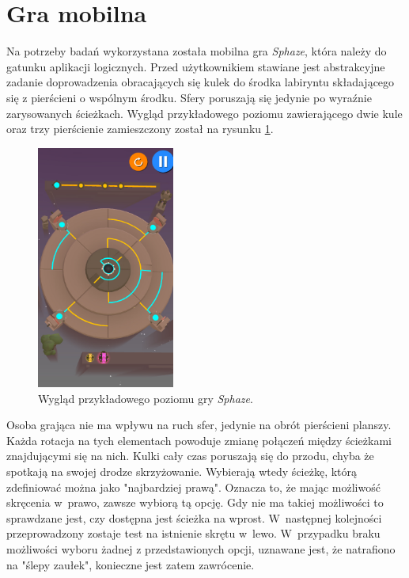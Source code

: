 \documentclass[a4paper,12pt,numbers=noenddot]{report}
\begin{document}
\section{Gra mobilna}
Na potrzeby badań wykorzystana została mobilna gra \textit{Sphaze}, która należy do gatunku aplikacji logicznych. Przed użytkownikiem stawiane jest abstrakcyjne zadanie doprowadzenia obracających się kulek do środka labiryntu składającego się z pierścieni o wspólnym środku. Sfery poruszają się jedynie po wyraźnie zarysowanych ścieżkach. Wygląd przykładowego poziomu zawierającego dwie kule oraz trzy pierścienie zamieszczony został na rysunku \ref{fig:sphaze_1}.

\begin{figure}[h!]
	\centering
  	\includegraphics[height=8cm]{fig/twoBalls_threeRings.jpg}
	\caption{Wygląd przykładowego poziomu gry \textit{Sphaze}.}
	\label{fig:sphaze_1}
\end{figure}

Osoba grająca nie ma wpływu na ruch sfer, jedynie na obrót pierścieni planszy. Każda rotacja na tych elementach powoduje zmianę połączeń między ścieżkami znajdującymi się na nich. Kulki cały czas poruszają się do przodu, chyba że spotkają na swojej drodze skrzyżowanie. Wybierają wtedy ścieżkę, którą zdefiniować można jako "najbardziej prawą". Oznacza to, że mając możliwość skręcenia w~prawo, zawsze wybiorą tą opcję. Gdy nie ma takiej możliwości to sprawdzane jest, czy dostępna jest ścieżka na wprost. W~następnej kolejności przeprowadzony zostaje test na istnienie skrętu w~lewo. W~przypadku braku możliwości wyboru żadnej z przedstawionych opcji, uznawane jest, że natrafiono na "ślepy zaułek", konieczne jest zatem zawrócenie.
\end{document}

